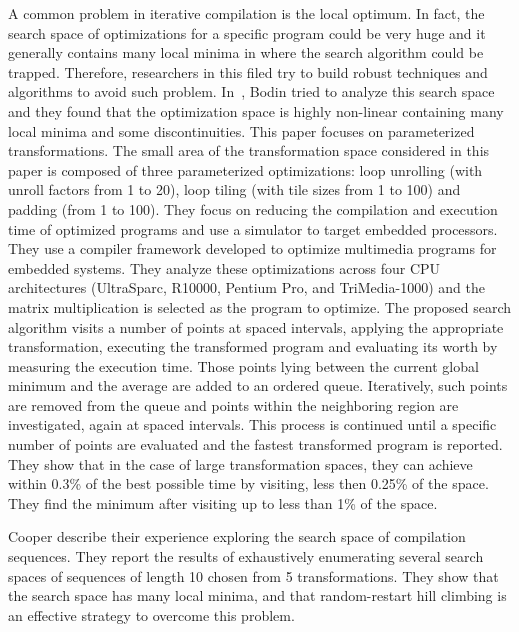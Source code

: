 A common problem in iterative compilation is the local optimum. In fact, the search space of optimizations for a specific program could be very huge and it generally contains many local minima in where the search algorithm could be trapped\cite{bodin1998iterative}. Therefore, researchers in this filed try to build robust techniques and algorithms to avoid such problem.
In~\cite{bodin1998iterative}, Bodin \etal tried to analyze this search space and they found that the optimization space is highly non-linear containing many local minima and some discontinuities.
This paper focuses on parameterized transformations. The small area of the transformation space considered in this paper is composed of three parameterized optimizations: loop unrolling (with unroll factors from 1 to 20), loop tiling (with tile sizes from 1 to 100) and padding (from 1 to 100). They focus on reducing the compilation and execution time of optimized programs and use a simulator to target embedded processors. They use a compiler framework developed to optimize multimedia programs for embedded systems.
They analyze these optimizations across four CPU architectures (UltraSparc, R10000, Pentium Pro, and TriMedia-1000) and the matrix multiplication is selected as the program to optimize.
The proposed search algorithm visits a number of points at spaced intervals, applying the appropriate transformation, executing the transformed program and evaluating its worth by measuring the execution time. Those points lying between the current global minimum and the average are added to an ordered queue. Iteratively, such points are removed from the queue and points within the neighboring region are investigated, again at spaced intervals. This process is continued until a specific number of points are evaluated and the fastest transformed program is reported.
They show that in the case of large transformation spaces, they can achieve within 0.3\% of the best possible time by visiting, less then 0.25\% of the space. They find the minimum after visiting up to less than 1\% of the space.

Cooper \etal\cite{cooper2006exploring} describe their experience exploring the search space of compilation sequences. They report the results of exhaustively enumerating several search spaces of sequences of length 10 chosen from 5 transformations. They show that the search space has many local minima, and that random-restart hill climbing is an effective strategy to overcome this problem.


